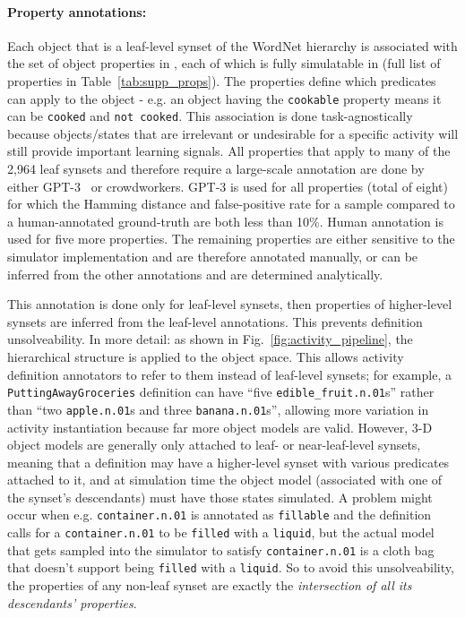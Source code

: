 \paragraph{Property annotations:} Each object that is a leaf-level synset of the WordNet hierarchy is associated with the set of object properties in \benchmark, each of which is fully simulatable in \simulator (full list of properties in Table~\ref{tab:supp_props}). The properties define which predicates can apply to the object - e.g. an object having the \texttt{cookable} property means it can be \texttt{cooked} and \texttt{not cooked}. This association is done task-agnostically because objects/states that are irrelevant or undesirable for a specific activity will still provide important learning signals. All properties that apply to many of the 2,964 leaf synsets and therefore require a large-scale annotation are done by either GPT-3~\cite{gpt3} or crowdworkers. GPT-3 is used for all properties (total of eight) for which the Hamming distance and false-positive rate for a sample compared to a human-annotated ground-truth are both less than 10\%. Human annotation is used for five more properties. The remaining properties are either sensitive to the simulator implementation and are therefore annotated manually, or can be inferred from the other annotations and are determined analytically. 

This annotation is done only for leaf-level synsets, then properties of higher-level synsets are inferred from the leaf-level annotations. This prevents definition unsolveability. In more detail: as shown in Fig.~\ref{fig:activity_pipeline}, the hierarchical structure is applied to the object space. This allows activity definition annotators to refer to them instead of leaf-level synsets; for example, a \texttt{PuttingAwayGroceries} definition can have ``five \texttt{edible\_fruit.n.01}s'' rather than ``two \texttt{apple.n.01}s and three \texttt{banana.n.01}s'', allowing more variation in activity instantiation because far more object models are valid. However, 3-D object models are generally only attached to leaf- or near-leaf-level synsets, meaning that a definition may have a higher-level synset with various predicates attached to it, and at simulation time the object model (associated with one of the synset's descendants) must have those states simulated. A problem might occur when e.g. \texttt{container.n.01} is annotated as \texttt{fillable} and the definition calls for a \texttt{container.n.01} to be \texttt{filled} with a \texttt{liquid}, but the actual model that gets sampled into the simulator to satisfy \texttt{container.n.01} is a cloth bag that doesn't support being \texttt{filled} with a \texttt{liquid}. So to avoid this unsolveability, the properties of any non-leaf synset are exactly the \textit{intersection of all its descendants' properties}.

